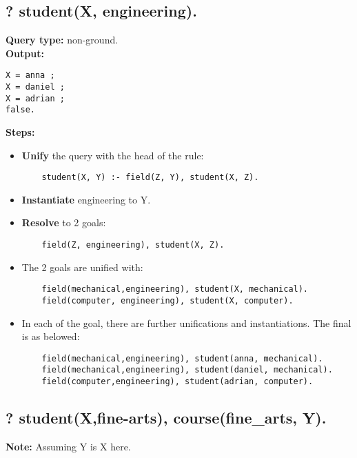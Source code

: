 \newpage
\subsection{? student(X, engineering).}
\textbf{Query type: } non-ground. \\
\textbf{Output:} 
\begin{lstlisting}
X = anna ; 
X = daniel ; 
X = adrian ; 
false. 
\end{lstlisting}

\textbf{Steps:}
\begin{itemize}
    \item \textbf{Unify} the query with the head of the rule:
    \begin{lstlisting}
    student(X, Y) :- field(Z, Y), student(X, Z).
    \end{lstlisting}
    \item \textbf{Instantiate} engineering to Y.
    \item \textbf{Resolve} to 2 goals:
    \begin{lstlisting}
    field(Z, engineering), student(X, Z).
    \end{lstlisting}
    \item The 2 goals are unified with:
    \begin{lstlisting}
    field(mechanical,engineering), student(X, mechanical).
    field(computer, engineering), student(X, computer).
    \end{lstlisting}
    \item In each of the goal, there are further unifications and instantiations. The final is as belowed:
    \begin{lstlisting}
    field(mechanical,engineering), student(anna, mechanical).
    field(mechanical,engineering), student(daniel, mechanical).
    field(computer,engineering), student(adrian, computer).
    \end{lstlisting}
\end{itemize}

\subsection{? student(X,fine-arts), course(fine\_arts, Y).}
\textbf{Note:} Assuming Y is X here. 

